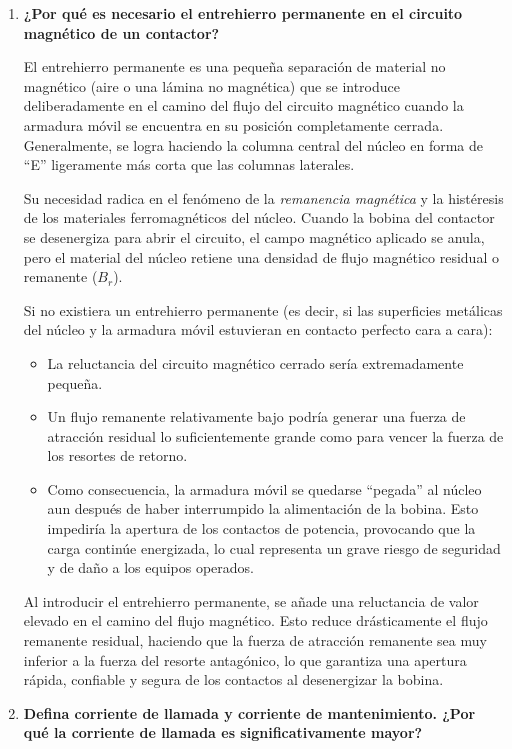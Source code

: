 \begin{enumerate}
    \item \textbf{¿Por qué es necesario el entrehierro permanente en el circuito magnético de un contactor?}

    El entrehierro permanente es una pequeña separación de material no magnético (aire o una lámina no magnética) que se introduce deliberadamente en el camino del flujo del circuito magnético cuando la armadura móvil se encuentra en su posición completamente cerrada. Generalmente, se logra haciendo la columna central del núcleo en forma de ``E'' ligeramente más corta que las columnas laterales.

    Su necesidad radica en el fenómeno de la \textit{remanencia magnética} y la histéresis de los materiales ferromagnéticos del núcleo. Cuando la bobina del contactor se desenergiza para abrir el circuito, el campo magnético aplicado se anula, pero el material del núcleo retiene una densidad de flujo magnético residual o remanente ($B_r$).

    Si no existiera un entrehierro permanente (es decir, si las superficies metálicas del núcleo y la armadura móvil estuvieran en contacto perfecto cara a cara):
    \begin{itemize}
        \item La reluctancia del circuito magnético cerrado sería extremadamente pequeña.
        \item Un flujo remanente relativamente bajo podría generar una fuerza de atracción residual lo suficientemente grande como para vencer la fuerza de los resortes de retorno.
        \item Como consecuencia, la armadura móvil se quedarse ``pegada'' al núcleo aun después de haber interrumpido la alimentación de la bobina. Esto impediría la apertura de los contactos de potencia, provocando que la carga continúe energizada, lo cual representa un grave riesgo de seguridad y de daño a los equipos operados.
    \end{itemize}

    Al introducir el entrehierro permanente, se añade una reluctancia de valor elevado en el camino del flujo magnético. Esto reduce drásticamente el flujo remanente residual, haciendo que la fuerza de atracción remanente sea muy inferior a la fuerza del resorte antagónico, lo que garantiza una apertura rápida, confiable y segura de los contactos al desenergizar la bobina.

    \item \textbf{Defina corriente de llamada y corriente de mantenimiento. ¿Por qué la corriente de llamada es significativamente mayor?}


\end{enumerate}
